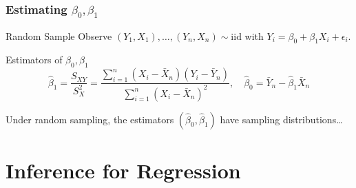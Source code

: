 \begin{frame}
	\frametitle{Estimating $\beta_0, \beta_1$}

\begin{block}{Random Sample}
  Observe $(Y_1, X_1), \hdots, (Y_n, X_n) \sim \text{iid}$ with $Y_i = \beta_0 + \beta_1 X_i + \epsilon_i$. 
\end{block}
  
\begin{block}{Estimators of $\beta_0, \beta_1$}
\[
  \widehat{\beta}_1 = \frac{S_{XY}}{S_X^2} = \frac{\sum_{i=1}^n (X_i - \bar{X}_n) (Y_i - \bar{Y}_n)}{\sum_{i=1}^n (X_i - \bar{X}_n)^2}, \quad
	\widehat{\beta}_0 = \bar{Y}_n - \widehat{\beta}_1 \bar{X}_n
\]
\end{block}

\vspace{1em}
\alert{Under random sampling, the estimators $(\widehat{\beta}_0, \widehat{\beta}_1)$ have sampling distributions\dots}
\end{frame}

\section{Inference for Regression}

